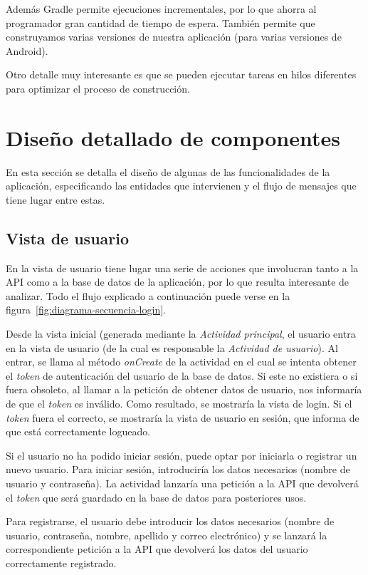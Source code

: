 Además Gradle permite ejecuciones incrementales, por lo que ahorra al
programador gran cantidad de tiempo de espera. También permite que construyamos
varias versiones de nuestra aplicación (para varias versiones de Android).

Otro detalle muy interesante es que se pueden ejecutar tareas en hilos
diferentes para optimizar el proceso de construcción.


\section{Diseño detallado de componentes}

En esta sección se detalla el diseño de algunas de las funcionalidades de la
aplicación, especificando las entidades que intervienen y el flujo de mensajes
que tiene lugar entre estas.

\subsection{Vista de usuario}

En la vista de usuario tiene lugar una serie de acciones que involucran tanto
a la API como a la base de datos de la aplicación, por lo que resulta interesante
de analizar. Todo el flujo explicado a continuación puede verse en la
figura~\ref{fig:diagrama-secuencia-login}.

Desde la vista inicial (generada mediante la \textit{Actividad principal}, el
usuario entra en la vista de usuario (de la cual es responsable la
\textit{Actividad de usuario}). Al entrar, se llama al método \textit{onCreate}
de la actividad en el cual se intenta obtener el \textit{token} de autenticación
del usuario de la base de datos. Si este no existiera o si fuera obsoleto, al
llamar a la petición de obtener datos de usuario, nos informaría de que el
\textit{token} es inválido. Como resultado, se mostraría la vista de login. Si
el \textit{token} fuera el correcto, se mostraría la vista de usuario en
sesión, que informa de que está correctamente logueado.

Si el usuario no ha podido iniciar sesión, puede optar por iniciarla o registrar
un nuevo usuario. Para iniciar sesión, introduciría los datos necesarios
(nombre de usuario y contraseña). La actividad lanzaría una petición a la API
que devolverá el \textit{token} que será guardado en la base de datos para
posteriores usos.

Para registrarse, el usuario debe introducir los datos necesarios (nombre de
usuario, contraseña, nombre, apellido y correo electrónico) y se lanzará la
correspondiente petición a la API que devolverá los datos del usuario
correctamente registrado.

